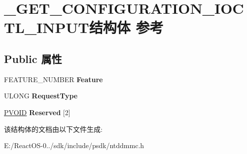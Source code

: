 \hypertarget{struct___g_e_t___c_o_n_f_i_g_u_r_a_t_i_o_n___i_o_c_t_l___i_n_p_u_t}{}\section{\+\_\+\+G\+E\+T\+\_\+\+C\+O\+N\+F\+I\+G\+U\+R\+A\+T\+I\+O\+N\+\_\+\+I\+O\+C\+T\+L\+\_\+\+I\+N\+P\+U\+T结构体 参考}
\label{struct___g_e_t___c_o_n_f_i_g_u_r_a_t_i_o_n___i_o_c_t_l___i_n_p_u_t}
\subsection*{Public 属性}
\begin{DoxyCompactItemize}
\item 
\mbox{\label{struct___g_e_t___c_o_n_f_i_g_u_r_a_t_i_o_n___i_o_c_t_l___i_n_p_u_t_a6e17b84b01262a579a19357de69f6c85}} 
F\+E\+A\+T\+U\+R\+E\+\_\+\+N\+U\+M\+B\+ER {\bfseries Feature}
\item 
\mbox{\label{struct___g_e_t___c_o_n_f_i_g_u_r_a_t_i_o_n___i_o_c_t_l___i_n_p_u_t_ae5e23a7311b75dcebc894dd5df941092}} 
U\+L\+O\+NG {\bfseries Request\+Type}
\item 
\mbox{\label{struct___g_e_t___c_o_n_f_i_g_u_r_a_t_i_o_n___i_o_c_t_l___i_n_p_u_t_a8d3e6a9e86b017f58dc45a2b5bb17bc9}} 
\hyperlink{interfacevoid}{P\+V\+O\+ID} {\bfseries Reserved} \mbox{[}2\mbox{]}
\end{DoxyCompactItemize}


该结构体的文档由以下文件生成\+:\begin{DoxyCompactItemize}
\item 
E\+:/\+React\+O\+S-\/0../sdk/include/psdk/ntddmmc.\+h\end{DoxyCompactItemize}

